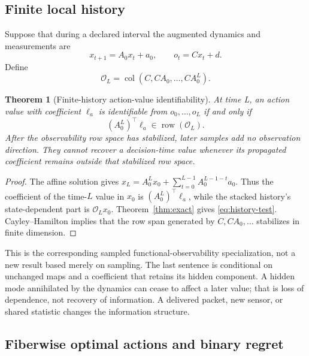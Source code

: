 \documentclass[10pt,twocolumn,twoside]{IEEEtran}
\newtheorem{theorem}{Theorem}
\DeclareMathOperator{\row}{row}
\DeclareMathOperator{\col}{col}
\begin{document}
\subsection{Finite local history}

Suppose that during a declared interval the augmented dynamics and
measurements are
\begin{equation}
x_{t+1}=A_0x_t+a_0,\qquad o_t=Cx_t+d.
\end{equation}
Define
\begin{equation}
\mathcal O_L=\col(C,CA_0,\ldots,CA_0^L).
\end{equation}

\begin{theorem}[Finite-history action-value identifiability]
\label{thm:history}
At time L, an action value with coefficient \(\ell_a\) is identifiable from
\(o_0,\ldots,o_L\) if and only if
\begin{equation}
(A_0^L)^\top\ell_a\in\row(\mathcal O_L).
\label{eq:history-test}
\end{equation}
After the observability row space has stabilized, later samples add no
observation direction.  They cannot recover a decision-time value whenever
its propagated coefficient remains outside that stabilized row space.
\end{theorem}

\begin{proof}
The affine solution gives
\(x_L=A_0^Lx_0+\sum_{t=0}^{L-1}A_0^{L-1-t}a_0\).  Thus the coefficient of
the time-\(L\) value in \(x_0\) is \((A_0^L)^\top\ell_a\), while the stacked history's
state-dependent part is \(\mathcal O_Lx_0\).  Theorem~\ref{thm:exact} gives
\eqref{eq:history-test}.  Cayley--Hamilton implies that the row span generated
by \(C,CA_0,\ldots\) stabilizes in finite dimension.
\end{proof}

This is the corresponding sampled functional-observability specialization,
not a new result based merely on sampling.  The last sentence is conditional
on unchanged maps and a coefficient that
retains its hidden component.  A hidden mode annihilated by the dynamics can
cease to affect a later value; that is loss of dependence, not recovery of
information.  A delivered packet, new sensor, or shared statistic changes the
information structure.

\subsection{Fiberwise optimal actions and binary regret}
\end{document}
